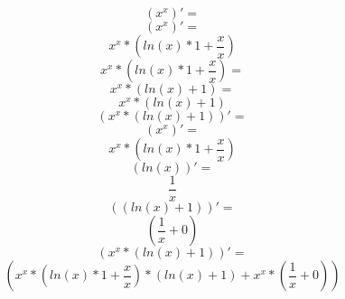 \documentclass[a4paper,12pt]{article}
\begin{document}
\begin{equation}
\left( {x }^ {x }\right)' =
\end{equation}
\begin{equation}
\left( {x }^ {x }\right)' =
\end{equation}
\begin{equation}
{{x }^ {x }}* {\left( {{ln \left( {x }\right) }* {1 }}+ {\frac{{x }}{{x }}}\right) }
\end{equation}
\begin{equation}
{{x }^ {x }}* {\left( {{ln \left( {x }\right) }* {1 }}+ {\frac{{x }}{{x }}}\right) }=
\end{equation}
\begin{equation}
{{x }^ {x }}* {\left( {ln \left( {x }\right) }+ {1 }\right) }=
\end{equation}
\begin{equation}
{{x }^ {x }}* {\left( {ln \left( {x }\right) }+ {1 }\right) }
\end{equation}
\begin{equation}
\left( {{x }^ {x }}* {\left( {ln \left( {x }\right) }+ {1 }\right) }\right)' =
\end{equation}
\begin{equation}
\left( {x }^ {x }\right)' =
\end{equation}
\begin{equation}
{{x }^ {x }}* {\left( {{ln \left( {x }\right) }* {1 }}+ {\frac{{x }}{{x }}}\right) }
\end{equation}
\begin{equation}
\left( ln \left( {x }\right) \right)' =
\end{equation}
\begin{equation}
\frac{{1 }}{{x }}
\end{equation}
\begin{equation}
\left( \left( {ln \left( {x }\right) }+ {1 }\right) \right)' =
\end{equation}
\begin{equation}
\left( {\frac{{1 }}{{x }}}+ {0 }\right) 
\end{equation}
\begin{equation}
\left( {{x }^ {x }}* {\left( {ln \left( {x }\right) }+ {1 }\right) }\right)' =
\end{equation}
\begin{equation}
\left( {{{{x }^ {x }}* {\left( {{ln \left( {x }\right) }* {1 }}+ {\frac{{x }}{{x }}}\right) }}* {\left( {ln \left( {x }\right) }+ {1 }\right) }}+ {{{x }^ {x }}* {\left( {\frac{{1 }}{{x }}}+ {0 }\right) }}\right) 
\end{equation}
\end{document}
